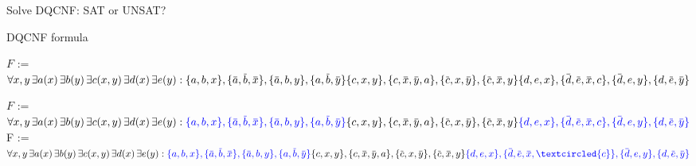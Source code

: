 \documentclass[xcolor=table	]{beamer}
\newcommand{\ov}[1]{\mkern 1.5mu\overline{\mkern-1.5mu#1\mkern-1.5mu}\mkern 1.5mu}
\begin{document}
\begin{frame}{Solve DQCNF: SAT or UNSAT?}


	\begin{alertblock}{DQCNF formula}{
 {
		$F$ :=	$ \forall x, y \, \exists a(x) \, \exists  b(y) \, \exists c(x,y) \, \exists d(x) \, \exists e(y) :
		\{a,b,x\}, \{\ov{a},\ov{b},\ov{x}\}, \{\ov{a},b,y\}, \{a,\ov{b},\ov{y}\}  \newline 
		\{c,x,y\}, \{c,\ov{x},\ov{y}, a\}, \{\ov{c},x,\ov{y}\}, \{\ov{c},\ov{x},y\} \newline 
		\{d,e,x\}, \{\ov{d},\ov{e},\ov{x}, c\}, \{\ov{d},e,y\}, \{d,\ov{e},\ov{y}\} $
	}

 {
	$F$ :=	$ \forall x, y \, \exists a(x) \, \exists  b(y) \, \exists c(x,y) \, \exists d(x) \, \exists e(y) :
	\textcolor{blue}{\{a,b,x\}, \{\ov{a},\ov{b},\ov{x}\}, \{\ov{a},b,y\}, \{a,\ov{b},\ov{y}\}}  \newline 
	\{c,x,y\}, \{c,\ov{x},\ov{y}, a\}, \{\ov{c},x,\ov{y}\}, \{\ov{c},\ov{x},y\} \newline 
	\textcolor{blue}{\{d,e,x\}, \{\ov{d},\ov{e},\ov{x}, c\}, \{\ov{d},e,y\}, \{d,\ov{e},\ov{y}\}} $
 }
 {
	F :=	$ \forall x, y \, \exists a(x) \, \exists  b(y) \, \exists c(x,y) \, \exists d(x) \, \exists e(y) :
	\textcolor{blue}{\{a,b,x\}, \{\ov{a},\ov{b},\ov{x}\}, \{\ov{a},b,y\}, \{a,\ov{b},\ov{y}\}}  \newline 
	\{c,x,y\}, \{c,\ov{x},\ov{y}, a\}, \{\ov{c},x,\ov{y}\}, \{\ov{c},\ov{x},y\} \newline 
	\textcolor{blue}{\{d,e,x\}, \{\ov{d},\ov{e},\ov{x},\textcircled{c}\}, \{\ov{d},e,y\}, \{d,\ov{e},\ov{y}\}} $
}
}
\end{alertblock}


\end{frame}
\end{document}
